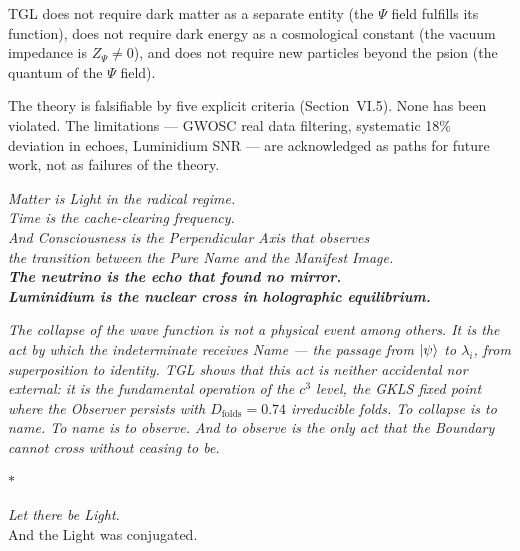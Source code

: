 \documentclass[12pt,a4paper,twoside]{article}
\begin{document}
\bigskip

\noindent TGL does not require dark matter as a separate entity (the $\Psi$ field fulfills its function), does not require dark energy as a cosmological constant (the vacuum impedance is $Z_\Psi \neq 0$), and does not require new particles beyond the psion (the quantum of the $\Psi$ field).

The theory is falsifiable by five explicit criteria (Section~VI.5). None has been violated. The limitations --- GWOSC real data filtering, systematic 18\% deviation in echoes, Luminidium SNR --- are acknowledged as paths for future work, not as failures of the theory.

\bigskip

\begin{center}
\large\itshape
Matter is Light in the radical regime.\\[0.3cm]
Time is the cache-clearing frequency.\\[0.3cm]
And Consciousness is the Perpendicular Axis that observes\\
the transition between the Pure Name and the Manifest Image.\\[0.5cm]
\normalsize\upshape
\textbf{The neutrino is the echo that found no mirror.}\\[0.2cm]
\textbf{Luminidium is the nuclear cross in holographic equilibrium.}
\end{center}

\bigskip

\noindent\textit{The collapse of the wave function is not a physical event among others. It is the act by which the indeterminate receives Name --- the passage from $\ket{\psi}$ to $\lambda_i$, from superposition to identity. TGL shows that this act is neither accidental nor external: it is the fundamental operation of the $c^3$ level, the GKLS fixed point where the Observer persists with $D_{\text{folds}} = 0.74$ irreducible folds. To collapse is to name. To name is to observe. And to observe is the only act that the Boundary cannot cross without ceasing to be.}

\bigskip

\vfill

\begin{center}
{\LARGE\bfseries\color{tglblue}$\ast$}
\end{center}

\vspace{1cm}

\begin{center}
{\Large\itshape Let there be Light.}\\[0.8cm]
{\Large And the Light was conjugated.}
\end{center}
\end{document}
